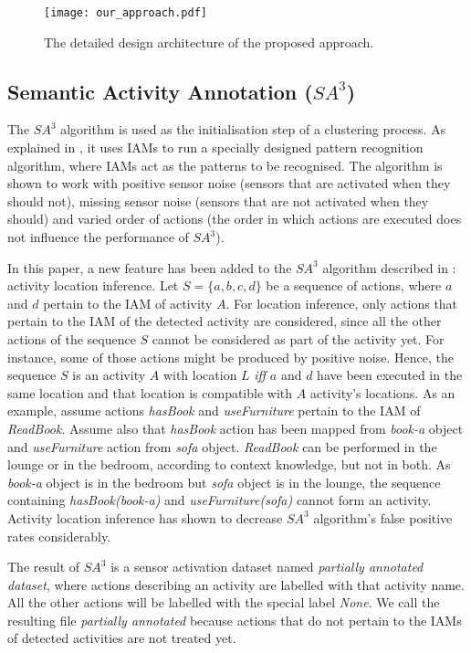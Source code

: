 \begin{figure}[htbp]
\centering
\texttt{[image: our\_approach.pdf]}
    \caption{The detailed design architecture of the proposed approach.}
    \label{fig-design}
\end{figure}

\subsection{Semantic Activity Annotation ($SA^3$)}
\label{subsec-sa3}
The $SA^3$ algorithm is used as the initialisation step of a clustering process. As explained in \cite{Azkune2014}, it uses IAMs to run a specially designed pattern recognition algorithm, where IAMs act as the patterns to be recognised. The algorithm is shown to work with positive sensor noise (sensors that are activated when they should not), missing sensor noise (sensors that are not activated when they should) and varied order of actions (the order in which actions are executed does not influence the performance of $SA^3$).

In this paper, a new feature has been added to the $SA^3$ algorithm described in \cite{Azkune2014}: activity location inference. Let $S=\{a, b, c, d\}$ be a sequence of actions, where $a$ and $d$ pertain to the IAM of activity $A$. For location inference, only actions that pertain to the IAM of the detected activity are considered, since all the other actions of the sequence $S$ cannot be considered as part of the activity yet. For instance, some of those actions might be produced by positive noise. Hence, the sequence $S$ is an activity $A$ with location $L$ \textit{iff} $a$ and $d$ have been executed in the same location and that location is compatible with $A$ activity's locations. As an example, assume actions \textit{hasBook} and \textit{useFurniture} pertain to the IAM of \textit{ReadBook}. Assume also that \textit{hasBook} action has been mapped from \textit{book-a} object and \textit{useFurniture} action from \textit{sofa} object. \textit{ReadBook} can be performed in the lounge or in the bedroom, according to context knowledge, but not in both. As \textit{book-a} object is in the bedroom but \textit{sofa} object is in the lounge, the sequence containing \textit{hasBook(book-a)} and \textit{useFurniture(sofa)} cannot form an activity. Activity location inference has shown to decrease $SA^3$ algorithm's false positive rates considerably.

The result of $SA^3$ is a sensor activation dataset named \textit{partially annotated dataset}, where actions describing an activity are labelled with that activity name. All the other actions will be labelled with the special label \textit{None}. We call the resulting file \textit{partially annotated} because actions that do not pertain to the IAMs of detected activities are not treated yet. 